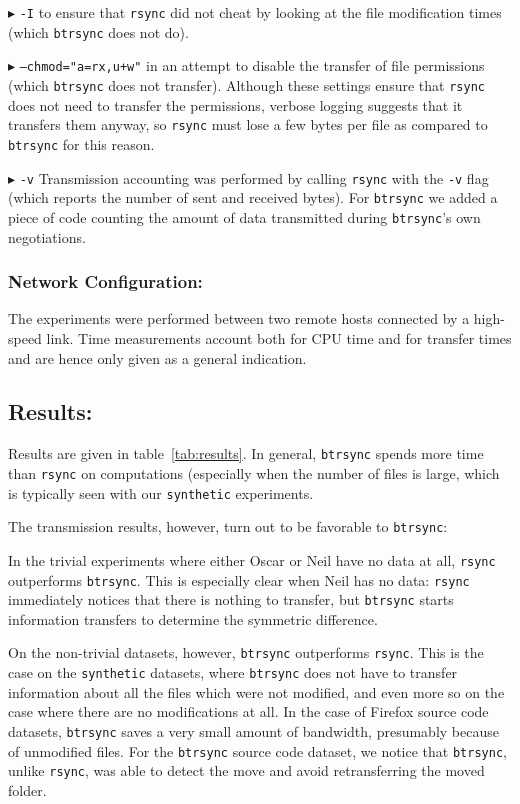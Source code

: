 \documentclass[11pt]{llncs}
\newcommand{\btrsync}{\texttt{btrsync}\xspace}
\newcommand{\rsync}{\texttt{rsync}\xspace}
\begin{document}
$\blacktriangleright$ {\tt -I} to ensure that \rsync did not cheat by looking at the file modification times (which \btrsync does not do).\smallskip

$\blacktriangleright$ {\tt --chmod="a=rx,u+w"} in an attempt to disable the transfer of file permissions (which \btrsync does not transfer). Although these settings ensure that \rsync does not need to transfer the permissions, verbose logging suggests that it transfers them anyway, so \rsync must lose a few bytes per file as compared to \btrsync for this reason.\smallskip

$\blacktriangleright$ {\tt -v} Transmission accounting was performed by calling \rsync with the {\tt -v} flag (which reports the number of sent and received bytes). For \btrsync we added a piece of code counting the amount of data transmitted during \btrsync's own negotiations.\smallskip

\subsubsection{Network Configuration:} The experiments were performed between two remote hosts connected by a high-speed link. Time measurements account both for CPU time and for transfer times and are hence only given as a general indication.

\subsection{Results:} 

Results are given in table~\ref{tab:results}. In general, \btrsync spends more time than \rsync on computations (especially when the number of files is large, which is typically seen with our {\tt synthetic} experiments.\smallskip

The transmission results, however, turn out to be favorable to \btrsync: 

In the trivial experiments where either Oscar or Neil have no data at all, \rsync outperforms \btrsync. This is especially clear when Neil has no data: \rsync immediately notices that there is nothing to transfer, but \btrsync starts information transfers to determine the symmetric difference.\smallskip

On the non-trivial datasets, however, \btrsync outperforms \rsync. This is the case on the {\tt synthetic} datasets, where \btrsync does not have to transfer information about all the files which were not modified, and even more so on the case where there are no modifications at all. In the case of Firefox source code datasets, \btrsync saves a very small amount of bandwidth, presumably because of unmodified files. For the \btrsync source code dataset, we notice that \btrsync, unlike \rsync, was able to detect the move and avoid retransferring the moved folder.
\end{document}
